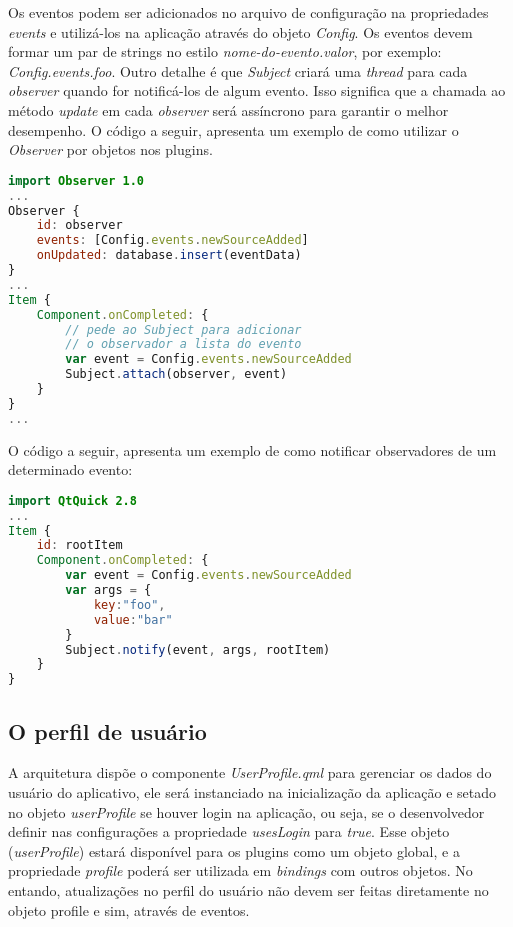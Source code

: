 Os eventos podem ser adicionados no arquivo de configuração na propriedades \textit{events} e utilizá-los na aplicação através do objeto \textit{Config}. Os eventos devem formar um par de strings no estilo \textit{nome-do-evento.valor}, por exemplo: \textit{Config.events.foo}. Outro detalhe é que \textit{Subject} criará uma \textit{thread} para cada \textit{observer} quando for notificá-los de algum evento. Isso significa que a chamada ao método \textit{update} em cada \textit{observer} será assíncrono para garantir o melhor desempenho. O código a seguir, apresenta um exemplo de como utilizar o \textit{Observer} por objetos nos plugins.

\begin{center}
\begin{lstlisting}[language=qml]
import Observer 1.0
...
Observer {
	id: observer
	events: [Config.events.newSourceAdded]
	onUpdated: database.insert(eventData)
}
...
Item {
	Component.onCompleted: {
		// pede ao Subject para adicionar
		// o observador a lista do evento
		var event = Config.events.newSourceAdded
		Subject.attach(observer, event)
	}
}
...
\end{lstlisting}
\end{center}

O código a seguir, apresenta um exemplo de como notificar observadores de um determinado evento:

\begin{center}
\begin{lstlisting}[language=qml]
import QtQuick 2.8
...
Item {
	id: rootItem
	Component.onCompleted: {
		var event = Config.events.newSourceAdded
		var args = {
			key:"foo",
			value:"bar"
		}
		Subject.notify(event, args, rootItem)
	}
}
\end{lstlisting}
\end{center}


\subsection{O perfil de usuário}\label{sec:solucao-desenvolvida}
A arquitetura dispõe o componente \textit{UserProfile.qml} para gerenciar os dados do usuário do aplicativo, ele será instanciado na inicialização da aplicação e setado no objeto \textit{userProfile} se houver login na aplicação, ou seja, se o desenvolvedor definir nas configurações a propriedade \textit{usesLogin} para \textit{true}. Esse objeto (\textit{userProfile}) estará disponível para os plugins como um objeto global, e a propriedade \textit{profile} poderá ser utilizada em \textit{bindings} com outros objetos. No entando, atualizações no perfil do usuário não devem ser feitas diretamente no objeto profile e sim, através de eventos.\par

